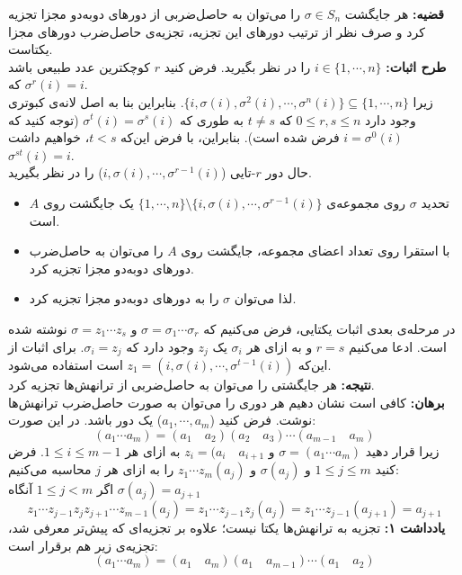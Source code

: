 	\textbf{قضیه:}
	هر جایگشت $\sigma \in S_n$ را می‌توان به حاصل‌ضربی از دور‌های دو‌به‌دو مجزا تجزیه کرد و صرف نظر از ترتیب دور‌های این تجزیه، تجزیه‌ی حاصل‌ضرب دور‌های مجزا یکتاست.\\
	\textbf{طرح اثبات:}
	$i\in\{1,\cdots,n\}$ را در نظر بگیرید. فرض کنید $r$ کوچکترین عدد طبیعی باشد که $\sigma^r(i) = i$.\\
	زیرا $\{i,\sigma(i),\sigma^2(i),\cdots,\sigma^n(i)\}\subseteq \{1,\cdots,n\}$. بنابراین بنا به اصل لانه‌ی کبوتری وجود دارد $0\leq r,s \leq n$ که $t\neq s$ به طوری که $\sigma^t(i) = \sigma^s(i)$ (توجه کنید که $i = \sigma^0(i)$ فرض شده است). بنابراین، با فرض این‌که $t<s$، خواهیم داشت $\sigma^{st}(i) = i$.\\
	حال دور $r$-تایی ($i,\sigma(i),\cdots,\sigma^{r-1}(i)$) را در نظر بگیرید.
	\begin{itemize}
		\item تحدید $\sigma$ روی مجموعه‌ی 
		$\{1,\cdots,n\} \setminus \{i,\sigma(i),\cdots,\sigma^{r-1}(i)\}$
		یک جایگشت روی $A$ است.
		\item با استقرا روی تعداد اعضای مجموعه، جایگشت روی $A$ را می‌توان به حاصل‌ضرب دور‌های دو‌به‌دو مجزا تجزیه کرد.
		\item لذا می‌توان $\sigma$ را به دور‌های دو‌به‌دو مجزا تجزیه کرد.
	\end{itemize}
	در مرحله‌ی بعدی اثبات یکتایی، فرض می‌کنیم که $\sigma = \sigma_1\cdots\sigma_r$ و $\sigma = z_1\cdots z_s$ نوشته شده است. ادعا می‌کنیم $r=s$ و به ازای هر $\sigma_i$ یک $z_j$ وجود دارد که $\sigma_i = z_j$. برای اثبات از این‌که $z_1 = (i, \sigma(i),\cdots,\sigma^{t-1}(i))$ است استفاده می‌شود.\\
	\textbf{نتیجه:}
	هر جایگشتی را می‌توان به حاصل‌ضربی از ترانهش‌ها تجزیه کرد.\\
	\textbf{برهان:}
	کافی است نشان دهیم هر دوری را می‌توان به صورت حاصل‌ضرب ترانهش‌ها نوشت. فرض کنید ($a_1,\cdots,a_m$) یک دور باشد. در این صورت:
	$$(a_1\cdots a_m) = (a_1 \quad a_2)(a_2 \quad a_3)\cdots(a_{m-1} \quad a_m)$$
	زیرا قرار دهید $\sigma = (a_1 \cdots a_m)$ و $z_i = (a_i \quad a_{i+1}$ به ازای هر $1\leq i \leq m-1$. فرض کنید $1\leq j \leq m$ و $\sigma(a_j)$ و $z_1\cdots z_m(a_j)$ را به ازای هر $j$ محاسبه می‌کنیم:\\
	اگر $1\leq j<m$ آنگاه $\sigma(a_j) = a_{j+1}$
	$$z_1\cdots z_{j-1} z_j z_{j+1} \cdots z_{m-1}(a_j) = z_1\cdots z_{j-1} z_j(a_j) = z_1\cdots z_{j-1}(a_{j+1}) = a_{j+1}$$
	\textbf{یادداشت ۱:}
	تجزیه به ترانهش‌ها یکتا نیست؛ علاوه بر تجزیه‌ای که پیش‌تر معرفی شد، تجزیه‌ی زیر هم برقرار است:
	$$(a_1 \cdots a_m) = (a_1\quad a_m)(a_1 \quad a_{m-1} ) \cdots (a_1 \quad a_2)$$
